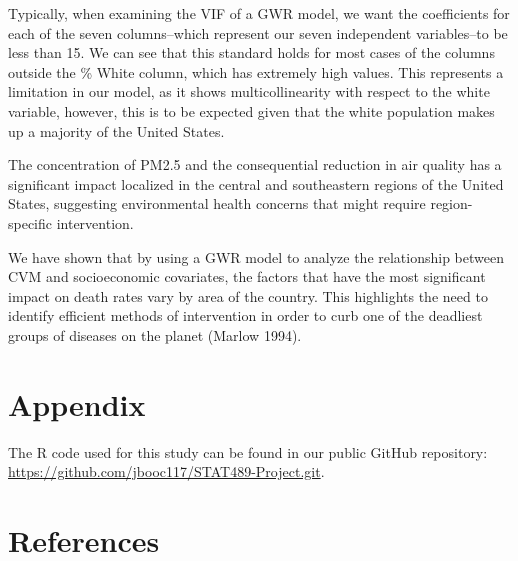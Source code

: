 \documentclass[
]{article}
\begin{document}
Typically, when examining the VIF of a GWR model, we want the
coefficients for each of the seven columns--which represent our seven
independent variables--to be less than 15. We can see that this standard
holds for most cases of the columns outside the \% White column, which
has extremely high values. This represents a limitation in our model, as
it shows multicollinearity with respect to the white variable, however,
this is to be expected given that the white population makes up a
majority of the United States.

The concentration of PM2.5 and the consequential reduction in air
quality has a significant impact localized in the central and
southeastern regions of the United States, suggesting environmental
health concerns that might require region-specific intervention.~

We have shown that by using a GWR model to analyze the relationship
between CVM and socioeconomic covariates, the factors that have the most
significant impact on death rates vary by area of the country. This
highlights the need to identify efficient methods of intervention in
order to curb one of the deadliest groups of diseases on the planet
(Marlow 1994).

\section{Appendix}\label{appendix}

The R code used for this study can be found in our public GitHub
repository: \url{https://github.com/jbooc117/STAT489-Project.git}.

\newpage{}

\section*{References}\label{references}
\end{document}
